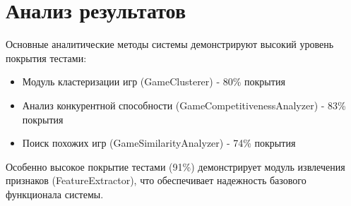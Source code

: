 \documentclass{article}
\begin{document}
\section{Анализ результатов}
Основные аналитические методы системы демонстрируют высокий уровень покрытия тестами:

\begin{itemize}
    \item Модуль кластеризации игр (GameClusterer) - 80\% покрытия
    \item Анализ конкурентной способности (GameCompetitivenessAnalyzer) - 83\% покрытия
    \item Поиск похожих игр (GameSimilarityAnalyzer) - 74\% покрытия
\end{itemize}

Особенно высокое покрытие тестами (91\%) демонстрирует модуль извлечения признаков (FeatureExtractor), что обеспечивает надежность базового функционала системы.
\end{document}
